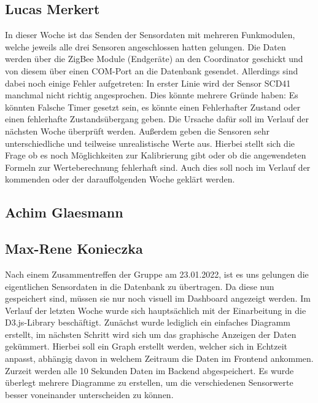 \documentclass[]{article}
\begin{document}
\subsection{Lucas Merkert}
In dieser Woche ist das Senden der Sensordaten mit mehreren Funkmodulen, welche jeweils alle drei Sensoren angeschlossen hatten gelungen. Die Daten werden über die ZigBee Module (Endgeräte) an den Coordinator geschickt und von diesem über einen COM-Port an die Datenbank gesendet. Allerdings sind dabei noch einige Fehler aufgetreten: In erster Linie wird der Sensor SCD41 manchmal nicht richtig angesprochen. Dies könnte mehrere Gründe haben: Es könnten Falsche Timer gesetzt sein, es könnte einen Fehlerhafter Zustand oder einen fehlerhafte Zustandsübergang geben. Die Ursache dafür soll im Verlauf der nächsten Woche überprüft werden. Außerdem geben die Sensoren sehr unterschiedliche und teilweise unrealistische Werte aus. Hierbei stellt sich die Frage ob es noch Möglichkeiten zur Kalibrierung gibt oder ob die angewendeten Formeln zur Werteberechnung fehlerhaft sind. Auch dies soll noch im Verlauf der kommenden oder der darauffolgenden Woche geklärt werden.


\subsection{Achim Glaesmann}


\subsection{Max-Rene Konieczka}
Nach einem Zusammentreffen der Gruppe am 23.01.2022, ist es uns gelungen die eigentlichen Sensordaten in die Datenbank zu übertragen. Da diese nun gespeichert sind, müssen sie nur noch visuell im Dashboard angezeigt werden. Im Verlauf der letzten Woche wurde sich hauptsächlich mit der Einarbeitung in die D3.js-Library beschäftigt. Zunächst wurde lediglich ein einfaches Diagramm erstellt, im nächsten Schritt wird sich um das graphische Anzeigen der Daten gekümmert. Hierbei soll ein Graph erstellt werden, welcher sich in Echtzeit anpasst, abhängig davon in welchem Zeitraum die Daten im Frontend ankommen. Zurzeit werden alle 10 Sekunden Daten im Backend abgespeichert. Es wurde überlegt mehrere Diagramme zu erstellen, um die verschiedenen Sensorwerte besser voneinander unterscheiden zu können.  
\end{document}
